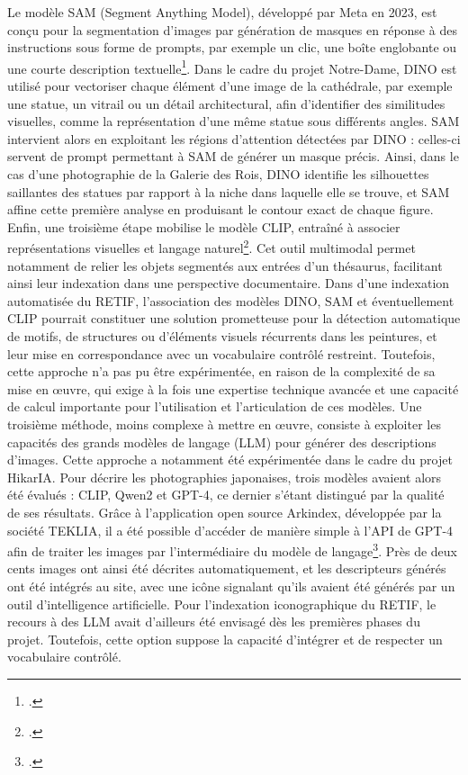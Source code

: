Le modèle SAM (Segment Anything Model), développé par Meta en 2023, est conçu pour la segmentation d’images par génération de masques en réponse à des instructions sous forme de prompts, par exemple un clic, une boîte englobante ou une courte description textuelle\footcite{kirillovSegmentAnything2023}. Dans le cadre du projet Notre-Dame, DINO est utilisé pour vectoriser chaque élément d’une image de la cathédrale, par exemple une statue, un vitrail ou un détail architectural, afin d’identifier des similitudes visuelles, comme la représentation d’une même statue sous différents angles. SAM intervient alors en exploitant les régions d’attention détectées par DINO : celles-ci servent de prompt permettant à SAM de générer un masque précis. Ainsi, dans le cas d’une photographie de la Galerie des Rois, DINO identifie les silhouettes saillantes des statues par rapport à la niche dans laquelle elle se trouve, et SAM affine cette première analyse en produisant le contour exact de chaque figure. Enfin, une troisième étape mobilise le modèle CLIP, entraîné à associer représentations visuelles et langage naturel\footcite{radfordLearningTransferableVisual2021}. Cet outil multimodal permet notamment de relier les objets segmentés aux entrées d’un thésaurus, facilitant ainsi leur indexation dans une perspective documentaire. Dans d’une indexation automatisée du RETIF, l’association des modèles DINO, SAM et éventuellement CLIP pourrait constituer une solution prometteuse pour la détection automatique de motifs, de structures ou d’éléments visuels récurrents dans les peintures, et leur mise en correspondance avec un vocabulaire contrôlé restreint. Toutefois, cette approche n’a pas pu être expérimentée, en raison de la complexité de sa mise en œuvre, qui exige à la fois une expertise technique avancée et une capacité de calcul importante pour l’utilisation et l’articulation de ces modèles.	
Une troisième méthode, moins complexe à mettre en œuvre, consiste à exploiter les capacités des grands modèles de langage (LLM) pour générer des descriptions d’images. Cette approche a notamment été expérimentée dans le cadre du projet HikarIA. Pour décrire les photographies japonaises, trois modèles avaient alors été évalués : CLIP, Qwen2 et GPT-4, ce dernier s’étant distingué par la qualité de ses résultats. Grâce à l’application open source Arkindex, développée par la société TEKLIA, il a été possible d’accéder de manière simple à l’API de GPT-4 afin de traiter les images par l’intermédiaire du modèle de langage\footcite{tekliaArkindexDocumentProcessing}. Près de deux cents images ont ainsi été décrites automatiquement, et les descripteurs générés ont été intégrés au site, avec une icône signalant qu’ils avaient été générés par un outil d’intelligence artificielle. Pour l’indexation iconographique du RETIF, le recours à des LLM avait d’ailleurs été envisagé dès les premières phases du projet. Toutefois, cette option suppose la capacité d’intégrer et de respecter un vocabulaire contrôlé.

